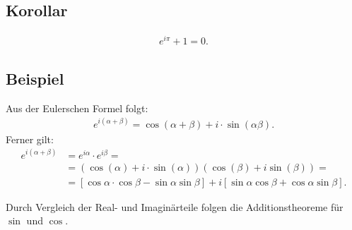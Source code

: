 	
\subsection{Korollar}

	\begin{align*}
	e^{i\pi}+1=0.
	\end{align*}


\subsection{Beispiel}

	Aus der Eulerschen Formel folgt:
	\begin{align*}
	e^{i(\alpha+\beta)}=\cos(\alpha+\beta)+i\cdot\sin(\alpha\beta).
	\end{align*}
	Ferner gilt:
	\begin{align*}
	e^{i(\alpha+\beta)}	&=e^{i\alpha}\cdot e^{i\beta}=\\
						&=(\cos(\alpha)+i\cdot \sin(\alpha))(\cos(\beta)+i\sin(\beta))=\\
						&=[\cos\alpha\cdot\cos\beta-\sin\alpha\sin\beta]+
						i[\sin\alpha\cos\beta+\cos\alpha\sin\beta].
	\end{align*}
	
	Durch Vergleich der Real- und Imaginärteile folgen die Additionstheoreme für $\sin$ und $\cos$.
